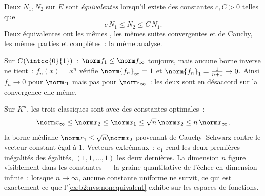 \begin{definition}\label{def:b2:nvs:equivalent}
Deux  $N_1, N_2$ sur $E$ sont \emph{équivalentes} lorsqu'il existe des constantes $c, C > 0$ telles que
\[
c\,N_1 \leq N_2 \leq C\, N_1 .
\]
Deux  équivalentes ont les mêmes , les mêmes suites
convergentes et de Cauchy, les mêmes parties  et complètes~:
la même analyse.
\end{definition}

\begin{example}\label{ex:b2:nvs:nonequivalent}
Sur $C(\intcc{0}{1})$~: $\norm f_1 \leq \norm f_\infty$ toujours, mais
aucune borne inverse ne tient~: $f_n(x) = x^n$ vérifie $\norm{f_n}_\infty = 1$
et $\norm{f_n}_1 = \frac{1}{n+1} \to 0$. Ainsi $f_n \to 0$ pour
$\norm\cdot_1$ mais pas pour $\norm\cdot_\infty$~: les deux 
sont en désaccord sur la convergence elle-même.
\end{example}

\begin{example}\label{ex:b2:nvs:constants}
Sur $K^n$, les trois  classiques sont  avec des
constantes optimales~:
\[
\norm x_\infty \leq \norm x_2 \leq \norm x_1
\leq \sqrt n\,\norm x_2 \leq n\,\norm x_\infty ,
\]
la borne médiane $\norm x_1 \leq \sqrt n\norm x_2$ provenant de
Cauchy--Schwarz contre le vecteur constant égal à $1$. Vecteurs
extrémaux~: $e_1$ rend les deux premières inégalités des égalités,
$(1, 1, \dots, 1)$ les deux dernières. La dimension $n$ figure
visiblement dans les constantes --- la graine quantitative de l'échec
en dimension infinie~: lorsque $n \to \infty$, aucune constante
uniforme ne survit, ce qui est exactement ce que l'\cref{ex:b2:nvs:nonequivalent}
exhibe sur les espaces de fonctions.
\end{example}

